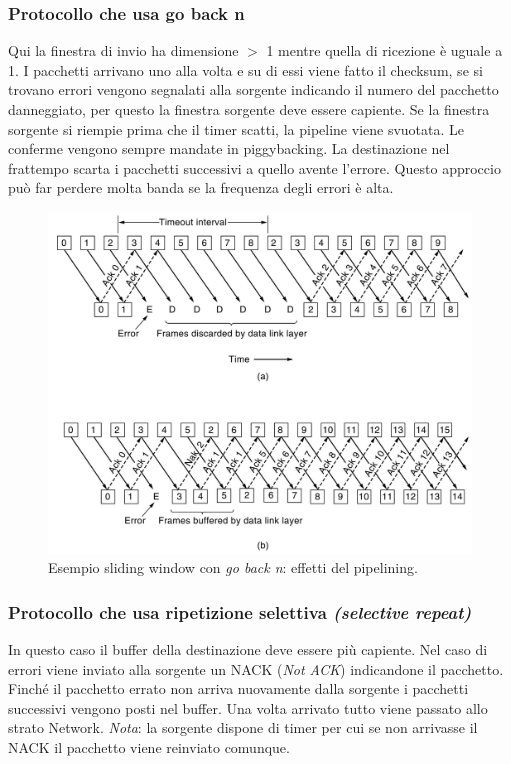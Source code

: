 \subsubsection{Protocollo che usa go back n}
Qui la finestra di invio ha dimensione \(>\) 1 mentre quella di ricezione è uguale a 1. I pacchetti arrivano uno alla volta e su di essi viene fatto il checksum, se si trovano errori vengono segnalati alla sorgente indicando il numero del pacchetto danneggiato, per questo la finestra sorgente deve essere capiente. Se la finestra sorgente si riempie prima che il timer scatti, la pipeline viene svuotata. Le conferme vengono sempre mandate in piggybacking. La destinazione nel frattempo scarta i pacchetti successivi a quello avente l'errore. Questo approccio può far perdere molta banda se la frequenza degli errori è alta.
\begin{figure}[htbp]
\centering
\includegraphics[scale=0.7]{images/gobackn.jpg}
\caption{Esempio sliding window con \textit{go back n}: effetti del pipelining.}
\end{figure}

\subsubsection{Protocollo che usa ripetizione selettiva \textit{(selective repeat)}}
In questo caso il buffer della destinazione deve essere più capiente. Nel caso di errori viene inviato alla sorgente un NACK (\textit{Not ACK}) indicandone il pacchetto. Finché il pacchetto errato non arriva nuovamente dalla sorgente i pacchetti successivi vengono posti nel buffer. Una volta arrivato tutto viene passato allo strato Network. \textit{Nota}: la sorgente dispone di timer per cui se non arrivasse il NACK il pacchetto viene reinviato comunque.


